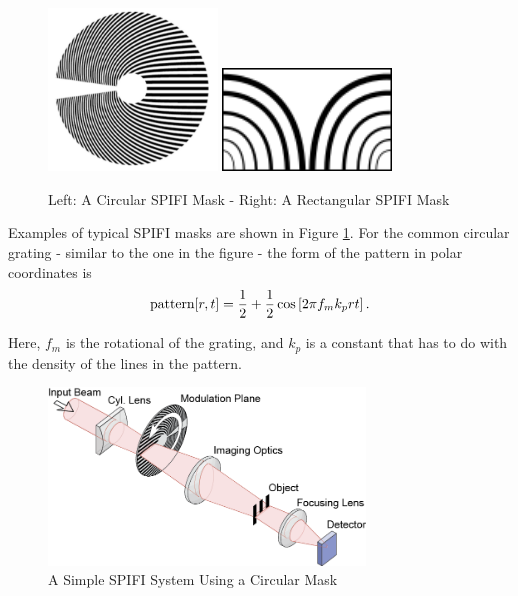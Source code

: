 \documentclass[12pt]{article}
\begin{document}
\begin{figure}[H]
\includegraphics[width=0.4\textwidth]{spinner}
\hfill
\includegraphics[width=0.4\textwidth]{rectangular_spifi_mask}
\caption{Left: A Circular SPIFI Mask -
Right: A Rectangular SPIFI Mask\label{fig:ex-grat}}
\end{figure}

Examples of typical SPIFI masks are
shown in Figure \ref{fig:ex-grat}. For the common circular grating - 
similar to the one in the figure - the form of the pattern in polar
coordinates is
\begin{equation}
\textnormal{pattern}[r,t]=\frac{1}{2}+\frac{1}{2}\cos\left[2\pi
f_mk_prt\right].
\label{eq:pattern}
\end{equation}

Here, $f_m$ is the rotational of the grating, and $k_p$ is a constant
that has to do with the density of the lines in the pattern.

\begin{figure}[H]
\centering
\includegraphics[width=0.75\textwidth]{circular_SPIFI_system}
\caption{A Simple SPIFI System Using a Circular Mask}
\label{fig:circ-sys}
\end{figure}
\end{document}
